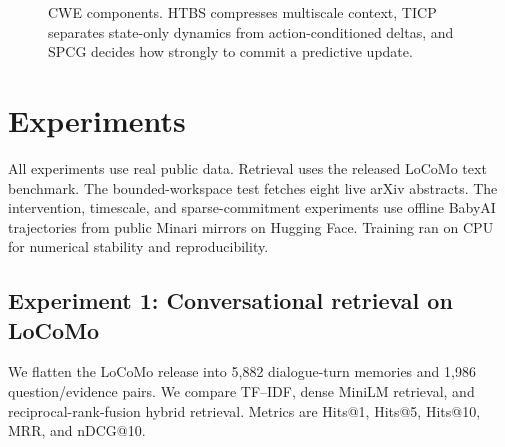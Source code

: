 \documentclass[11pt]{article}
\begin{document}
\begin{figure}[t]
\centering
{}
\caption{CWE components. HTBS compresses multiscale context, TICP separates state-only dynamics from action-conditioned deltas, and SPCG decides how strongly to commit a predictive update.}
\label{fig:cwe-architecture}
\end{figure}

\section{Experiments}
All experiments use real public data. Retrieval uses the released LoCoMo text benchmark. The bounded-workspace test fetches eight live arXiv abstracts. The intervention, timescale, and sparse-commitment experiments use offline BabyAI trajectories from public Minari mirrors on Hugging Face. Training ran on CPU for numerical stability and reproducibility.

\subsection{Experiment 1: Conversational retrieval on LoCoMo}
We flatten the LoCoMo release into 5,882 dialogue-turn memories and 1,986 question/evidence pairs. We compare TF--IDF, dense MiniLM retrieval, and reciprocal-rank-fusion hybrid retrieval. Metrics are Hits@1, Hits@5, Hits@10, MRR, and nDCG@10.
\end{document}
